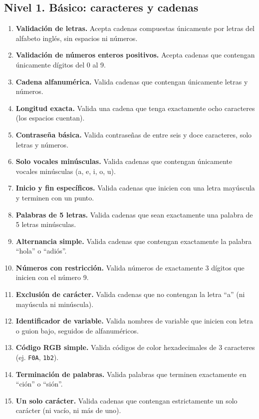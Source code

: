 \documentclass[12pt]{article}
\newcommand{\espacioalumno}{%
  \begin{flushleft}
  \vspace{5cm}
  \end{flushleft}
}
\begin{document}
{\subsection{Nivel 1. Básico: caracteres y cadenas}
\begin{enumerate}[label=\textbf{Ejercicio \arabic*.}]
\item \textbf{Validación de letras.} Acepta cadenas compuestas únicamente por letras del alfabeto inglés, sin espacios ni números.
\espacioalumno
\item \textbf{Validación de números enteros positivos.} Acepta cadenas que contengan únicamente dígitos del 0 al 9.
\espacioalumno
\item \textbf{Cadena alfanumérica.} Valida cadenas que contengan únicamente letras y números.
\espacioalumno
\item \textbf{Longitud exacta.} Valida una cadena que tenga exactamente ocho caracteres (los espacios cuentan).
\espacioalumno
\item \textbf{Contraseña básica.} Valida contraseñas de entre seis y doce caracteres, solo letras y números.
\espacioalumno
\item \textbf{Solo vocales minúsculas.} Valida cadenas que contengan únicamente vocales minúsculas (a, e, i, o, u).
  \vspace{7cm}
\item \textbf{Inicio y fin específicos.} Valida cadenas que inicien con una letra mayúscula y terminen con un punto.
\espacioalumno
\item \textbf{Palabras de 5 letras.} Valida cadenas que sean exactamente una palabra de 5 letras minúsculas.
\espacioalumno
\item \textbf{Alternancia simple.} Valida cadenas que contengan exactamente la palabra ``hola'' o ``adiós''.
  \vspace{8cm}
\item \textbf{Números con restricción.} Valida números de exactamente 3 dígitos que inicien con el número 9.
\espacioalumno
\item \textbf{Exclusión de carácter.} Valida cadenas que no contengan la letra ``a'' (ni mayúscula ni minúscula).
\espacioalumno
\item \textbf{Identificador de variable.} Valida nombres de variable que inicien con letra o guion bajo, seguidos de alfanuméricos.
  \vspace{8cm}
\item \textbf{Código RGB simple.} Valida códigos de color hexadecimales de 3 caracteres (ej. \texttt{F0A}, \texttt{1b2}).
\espacioalumno
\item \textbf{Terminación de palabras.} Valida palabras que terminen exactamente en ``ción'' o ``sión''.
\espacioalumno
\item \textbf{Un solo carácter.} Valida cadenas que contengan estrictamente un solo carácter (ni vacío, ni más de uno).
\espacioalumno
\end{enumerate}

}
\end{document}
